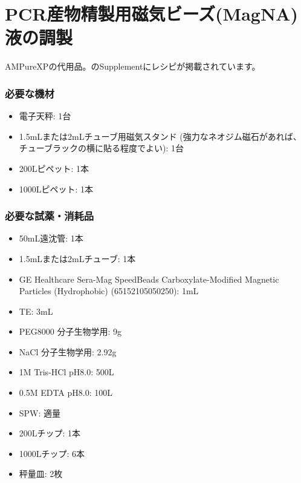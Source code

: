 \documentclass[titlepage,10pt,a4paper]{jsbook}
\begin{document}
\section{PCR産物精製用磁気ビーズ(MagNA)液の調製}\label{makingMagNA}

AMPureXPの代用品。\citet{Rohland2012}のSupplementにレシピが掲載されています。

\subsubsection{必要な機材}
\begin{itemize}
\item 電子天秤: 1台
\item 1.5mLまたは2mLチューブ用磁気スタンド (強力なネオジム磁石があれば、チューブラックの横に貼る程度でよい): 1台
\item 200{\textmu}Lピペット: 1本
\item 1000{\textmu}Lピペット: 1本
\end{itemize}

\subsubsection{必要な試薬・消耗品}
\begin{itemize}
\item 50mL遠沈管: 1本
\item 1.5mLまたは2mLチューブ: 1本
\item GE Healthcare Sera-Mag SpeedBeads Carboxylate-Modified Magnetic Particles (Hydrophobic) (65152105050250): 1mL
\item TE: 3mL
\item PEG8000 分子生物学用: 9g
\item NaCl 分子生物学用: 2.92g
\item 1M Tris-HCl pH8.0: 500{\textmu}L
\item 0.5M EDTA pH8.0: 100{\textmu}L
\item SPW: 適量
\item 200{\textmu}Lチップ: 1本
\item 1000{\textmu}Lチップ: 6本
\item 秤量皿: 2枚
\end{itemize}
\end{document}
